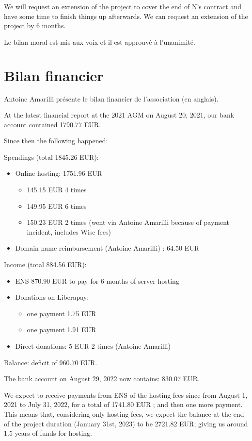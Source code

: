 \documentclass[a4paper]{article}
\begin{document}
We will request an extension of the project to cover the end of N's contract and have some time to finish things up afterwards. We can request an extension of the project by 6 months.

Le bilan moral est mis aux voix et il est approuvé à l'unanimité.

\section{Bilan financier}

Antoine Amarilli présente le bilan financier de l'association (en anglais).

At the latest financial report at the 2021 AGM on August 20, 2021, our bank account contained 1790.77 EUR.

Since then the following happened:

Spendings (total 1845.26 EUR):
\begin{itemize}
  \item Online hosting: 1751.96 EUR
    \begin{itemize}
      \item 145.15 EUR 4 times
      \item 149.95 EUR 6 times
      \item 150.23 EUR 2 times (went via Antoine Amarilli because of payment incident, includes Wise fees)
    \end{itemize}
      \item Domain name reimbursement (Antoine Amarilli) : 64.50 EUR
\end{itemize}

Income (total 884.56 EUR):
\begin{itemize}
  \item ENS 870.90 EUR to pay for 6 months of server hosting
  \item Donations on Liberapay:
    \begin{itemize}
      \item one payment 1.75 EUR
      \item one payment 1.91 EUR
    \end{itemize}
      \item Direct donations: 5 EUR 2 times (Antoine Amarilli)
\end{itemize}

Balance: deficit of 960.70 EUR.

The bank account on August 29, 2022 now contains: 830.07 EUR.

We expect to receive payments from ENS of the hosting fees since from August 1, 2021 to July 31, 2022, for a total of 1741.80 EUR ; and then one more payment. This means that, considering only hosting fees, we expect the balance at the end of the project duration (January 31st, 2023) to be 2721.82 EUR; giving us around 1.5 years of funds for hosting.
\end{document}
